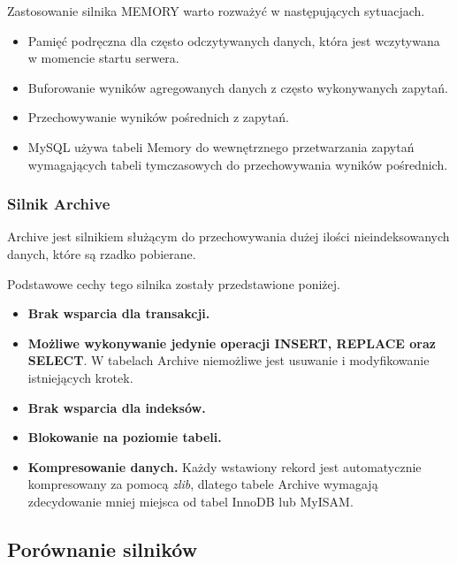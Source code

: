 Zastosowanie silnika MEMORY warto rozważyć w następujących sytuacjach.
\begin{itemize}
	\item Pamięć podręczna dla często odczytywanych danych, która jest wczytywana w momencie startu serwera.
	\item Buforowanie wyników agregowanych danych z często wykonywanych zapytań.
	\item Przechowywanie wyników pośrednich z zapytań.
	\item MySQL używa tabeli Memory do wewnętrznego przetwarzania zapytań wymagających tabeli tymczasowych do przechowywania wyników pośrednich.
\end{itemize}

\subsubsection{Silnik Archive}
Archive jest silnikiem służącym do przechowywania dużej ilości nieindeksowanych danych, które są rzadko pobierane. 

Podstawowe cechy tego silnika zostały przedstawione poniżej.
\begin{itemize}
	\item \textbf{Brak wsparcia dla transakcji.}
	\item \textbf{Możliwe wykonywanie jedynie operacji INSERT, REPLACE oraz SELECT}. W tabelach Archive niemożliwe jest usuwanie i modyfikowanie istniejących krotek.
	\item \textbf{Brak wsparcia dla indeksów.}
	\item \textbf{Blokowanie na poziomie tabeli.}
	\item \textbf{Kompresowanie danych.} Każdy wstawiony rekord jest automatycznie kompresowany za pomocą \textit{zlib}, dlatego tabele Archive wymagają zdecydowanie mniej miejsca od tabel InnoDB lub MyISAM.
\end{itemize}


\subsection{Porównanie silników}



